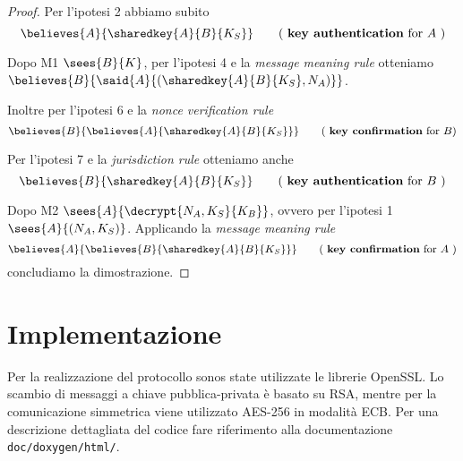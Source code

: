 \documentclass[a4paper]{article}
\begin{document}
\begin{proof}
Per l'ipotesi 2 abbiamo subito
\[
\believes{A}{ \sharedkey{A}{B}{K_S} }  \tag{ {\bf key authentication} for $A$ }
\]

Dopo M1 $\sees{B}{K}$, per l'ipotesi 4 e la {\em message meaning rule} otteniamo $ \believes{B}{ \said{A}{( \sharedkey{A}{B}{K_S}, N_A )} } $.

Inoltre per l'ipotesi 6 e la {\em nonce verification rule}
\[
\believes{B}{ \believes{A}{ \sharedkey{A}{B}{K_S} } }   \tag{ {\bf key confirmation} for $B$}
\]

Per l'ipotesi 7 e la {\em jurisdiction rule} otteniamo anche
\[
\believes{B}{ \sharedkey{A}{B}{K_S} } \tag{ {\bf key authentication} for $B$ }
\]

Dopo M2 $\sees{A}{ \decrypt{N_A,K_S}{K_B} }$, ovvero per l'ipotesi 1 $\sees{A}{ (N_A,K_S) }$. Applicando la {\em message meaning rule}
\[
\believes{A}{ \believes{B}{ \sharedkey{A}{B}{K_S} } } \tag{ {\bf key confirmation} for $A$ }
\]
concludiamo la dimostrazione.
\end{proof}


\section{Implementazione}
Per la realizzazione del protocollo sonos state utilizzate le librerie OpenSSL. Lo scambio di messaggi a chiave pubblica-privata è basato su RSA, mentre per la comunicazione simmetrica viene utilizzato AES-256 in modalità ECB. Per una descrizione dettagliata del codice fare riferimento alla documentazione {\tt doc/doxygen/html/}.
\end{document}
